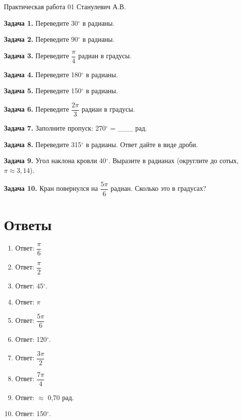 \documentclass{umk-matematika}
\begin{document}
\maketitlepage
    {Практическая работа 01}
    {}
    {Станулевич А.В.}

\textbf{Задача 1.} Переведите 30$^\circ$ в радианы.\par\vspace{10pt}
\textbf{Задача 2.} Переведите 90$^\circ$ в радианы.\par\vspace{10pt}
\textbf{Задача 3.} Переведите $\dfrac{\pi}{4}$ радиан в градусы.\par\vspace{10pt}
\textbf{Задача 4.} Переведите 180$^\circ$ в радианы.\par\vspace{10pt}
\textbf{Задача 5.} Переведите 150$^\circ$ в радианы.\par\vspace{10pt}
\textbf{Задача 6.} Переведите $\dfrac{2\pi}{3}$ радиан в градусы.\par\vspace{10pt}
\textbf{Задача 7.} Заполните пропуск: 270$^\circ$ = \_\_\_ рад.\par\vspace{10pt}
\textbf{Задача 8.} Переведите 315$^\circ$ в радианы. Ответ дайте в виде дроби.\par\vspace{10pt}
\textbf{Задача 9.} Угол наклона кровли 40$^\circ$. Выразите в радианах (округлите до сотых, $\pi \approx 3{,}14$).\par\vspace{10pt}
\textbf{Задача 10.} Кран повернулся на $\dfrac{5\pi}{6}$ радиан. Сколько это в градусах?\par\vspace{10pt}
\newpage
\section*{Ответы}

\begin{enumerate}
  \item Ответ: $\dfrac{\pi}{6}$
  \item Ответ: $\dfrac{\pi}{2}$
  \item Ответ: 45$^\circ$.
  \item Ответ: $\pi$
  \item Ответ: $\dfrac{5\pi}{6}$
  \item Ответ: 120$^\circ$.
  \item Ответ: $\dfrac{3\pi}{2}$
  \item Ответ: $\dfrac{7\pi}{4}$
  \item Ответ: $\approx$ 0,70 рад.
  \item Ответ: 150$^\circ$.
\end{enumerate}
\end{document}
